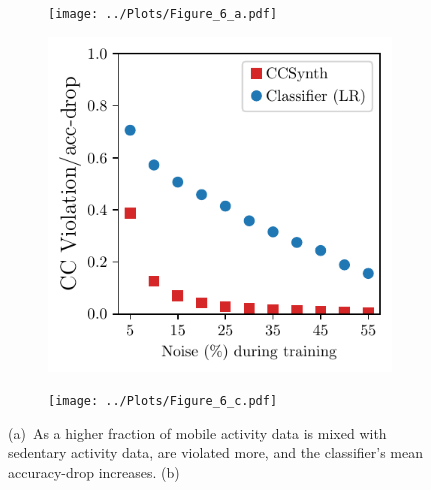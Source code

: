 \begin{figure}[t!]
	\centering
	\vspace{-3mm}
	\hspace{-3mm}
	\begin{subfigure}[t]{0.16\textwidth}
		\centering
		\texttt{[image: ../Plots/Figure\_6\_a.pdf]}
	\vspace{-5mm}
	\caption{\phantom{randomrand}}
	\label{fig:har-ml-experiment}
	\end{subfigure}	
	\begin{subfigure}[t]{0.16\textwidth}
		\centering
		\includegraphics[width=\linewidth]{../Plots/Figure_6_b.pdf}
	\vspace{-5mm}
	\caption{}
	\label{fig:har-ml-experiment-noise}
	\end{subfigure}	
	\begin{subfigure}[t]{0.16\textwidth}
		\centering
		\texttt{[image: ../Plots/Figure\_6\_c.pdf]}
	\vspace{-5mm}
	\caption{}
	\label{fig:gradual-drift-har}
	\end{subfigure}
	\vspace{-5mm}	
	\caption{(a)~As a higher fraction of mobile activity data is mixed with
sedentary activity data, \dis are violated more, and the classifier's
mean accuracy-drop increases. 
%
(b)~
}
\end{figure}
